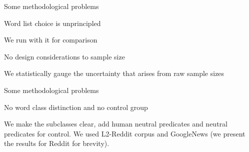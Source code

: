 \documentclass[10pt,ignorenonframetext,x11names, dvipsnames, bibspacing,natbib]{beamer}
\begin{document}
\begin{frame}{Some methodological problems}
\protect\hypertarget{some-methodological-problems}{}

\begin{block}{Word list choice is unprincipled}

We run with it for comparison

\pause

\end{block}

\begin{block}{No design considerations to sample size}

We statistically gauge the uncertainty that arises from raw sample sizes

\end{block}

\end{frame}

\begin{frame}{Some methodological problems}
\protect\hypertarget{some-methodological-problems-1}{}

\begin{block}{No word class distinction and no control group}

We make the subclasses clear, add human neutral predicates and neutral
predicates for control. We used L2-Reddit corpus and GoogleNews (we
present the results for Reddit for brevity).

\footnotesize 
\begin{table}

\caption{\label{tab:religionTableHeadLate}Rows from extended religion dataset.}
\centering
{}
\end{table}
\normalsize

\end{block}

\end{frame}
\end{document}
